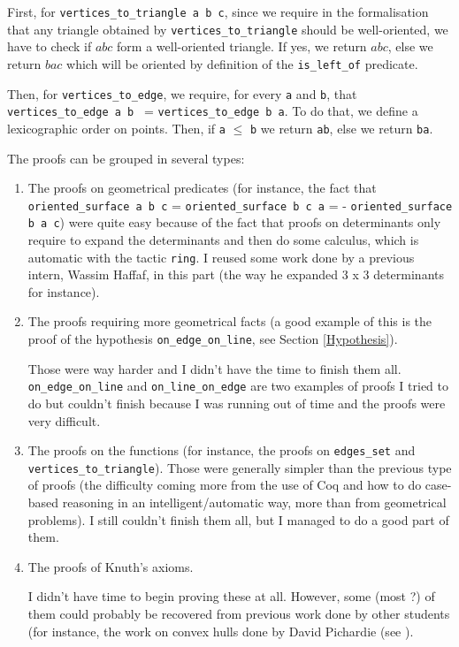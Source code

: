 \documentclass[a4paper,10pt]{article}
\begin{document}
\begin{itemize}
  First, for {\tt vertices\_to\_triangle a b c}, since we require in the formalisation that any triangle obtained by {\tt vertices\_to\_triangle} should be well-oriented, we have to check if $abc$ form a well-oriented triangle. If yes, we return $abc$, else we return $bac$ which will be oriented by definition of the {\tt is\_left\_of} predicate.

  Then, for {\tt vertices\_to\_edge}, we require, for every {\tt a} and {\tt b}, that {\tt vertices\_to\_edge a b } = {\tt vertices\_to\_edge b a}. To do that, we define a lexicographic order on points. Then, if {\tt a} $\leq$ {\tt b} we return {\tt ab}, else we return {\tt ba}.
\end{itemize}
The proofs can be grouped in several types:
\begin{enumerate}
\item The proofs on geometrical predicates (for instance, the fact that {\tt oriented\_surface a b c} = {\tt oriented\_surface b c a} = {- \tt oriented\_surface b a c}) were quite easy because of the fact that proofs on determinants only require to expand the determinants and then do some calculus, which is automatic with the tactic {\tt ring}. I reused some work done by a previous intern, Wassim Haffaf, in this part (the way he expanded 3 x 3 determinants for instance).
\item The proofs requiring more geometrical facts (a good example of this is the proof of the hypothesis {\tt on\_edge\_on\_line}, see Section \ref{Hypothesis}).

  Those were way harder and I didn't have the time to finish them all. {\tt on\_edge\_on\_line} and {\tt on\_line\_on\_edge} are two examples of proofs I tried to do but couldn't finish because I was running out of time and the proofs were very difficult.
  \item The proofs on the functions (for instance, the proofs on {\tt edges\_set} and {\tt vertices\_to\_triangle}). Those were generally simpler than the previous type of proofs (the difficulty coming more from the use of {\sc Coq} and how to do case-based reasoning in an intelligent/automatic way, more than from geometrical problems). I still couldn't finish them all, but I managed to do a good part of them. 

  \item The proofs of Knuth's axioms.

    I didn't have time to begin proving these at all. However, some (most ?) of them could probably be recovered from previous work done by other students (for instance, the work on convex hulls done by David Pichardie (see \cite{Hull}).
  \end{enumerate}
\end{document}
